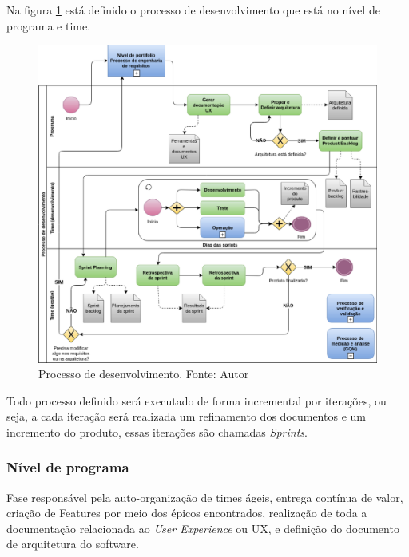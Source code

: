 Na figura \ref{fig:desenvolvimento} está definido o processo de desenvolvimento que está no nível de programa e time.

\begin{figure}[h!]
	\centering
  \includegraphics[keepaspectratio=true,scale=0.5]{figuras/desenvolvimento.eps}
  \caption[Processo de desenvolvimento.]{Processo de desenvolvimento. Fonte: Autor}
	\label{fig:desenvolvimento}
\end{figure}

Todo processo definido será executado de forma incremental por iterações, ou seja, a cada iteração será realizada um
refinamento dos documentos e um incremento do produto, essas iterações são chamadas \textit{Sprints}.

\subsubsection{Nível de programa}

Fase responsável pela auto-organização de times ágeis, entrega contínua de valor, criação de Features por meio dos épicos encontrados, realização de toda a documentação relacionada ao \textit{User Experience} ou UX, e definição do documento de arquitetura do software.

